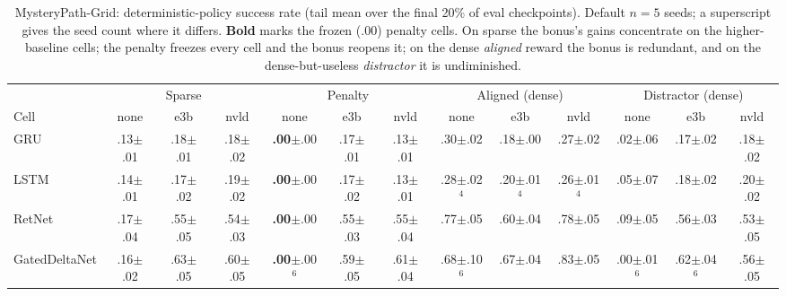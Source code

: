 \begin{table}[t]\centering
\caption{MysteryPath-Grid: deterministic-policy success rate (tail mean over the final 20\% of eval checkpoints). Default $n{=}5$ seeds; a superscript gives the seed count where it differs. \textbf{Bold} marks the frozen ($.00$) penalty cells. On sparse the bonus's gains concentrate on the higher-baseline cells; the penalty freezes every cell and the bonus reopens it; on the dense \emph{aligned} reward the bonus is redundant, and on the dense-but-useless \emph{distractor} it is undiminished.}
\label{tab:mpg}\small
\begin{tabular}{@{}l ccc ccc ccc ccc@{}}\toprule
 & \multicolumn{3}{c}{Sparse} & \multicolumn{3}{c}{Penalty} & \multicolumn{3}{c}{Aligned (dense)} & \multicolumn{3}{c}{Distractor (dense)} \\
\cmidrule(lr){2-4}\cmidrule(lr){5-7}\cmidrule(lr){8-10}\cmidrule(lr){11-13}
Cell & none & e3b & nvld & none & e3b & nvld & none & e3b & nvld & none & e3b & nvld \\\midrule
GRU & .13{\scriptsize$\pm$.01} & .18{\scriptsize$\pm$.01} & .18{\scriptsize$\pm$.02} & \textbf{.00}{\scriptsize$\pm$.00} & .17{\scriptsize$\pm$.01} & .13{\scriptsize$\pm$.01} & .30{\scriptsize$\pm$.02} & .18{\scriptsize$\pm$.00} & .27{\scriptsize$\pm$.02} & .02{\scriptsize$\pm$.06} & .17{\scriptsize$\pm$.02} & .18{\scriptsize$\pm$.02} \\
LSTM & .14{\scriptsize$\pm$.01} & .17{\scriptsize$\pm$.02} & .19{\scriptsize$\pm$.02} & \textbf{.00}{\scriptsize$\pm$.00} & .17{\scriptsize$\pm$.02} & .13{\scriptsize$\pm$.01} & .28{\scriptsize$\pm$.02}$^{4}$ & .20{\scriptsize$\pm$.01}$^{4}$ & .26{\scriptsize$\pm$.01}$^{4}$ & .05{\scriptsize$\pm$.07} & .18{\scriptsize$\pm$.02} & .20{\scriptsize$\pm$.02} \\
RetNet & .17{\scriptsize$\pm$.04} & .55{\scriptsize$\pm$.05} & .54{\scriptsize$\pm$.03} & \textbf{.00}{\scriptsize$\pm$.00} & .55{\scriptsize$\pm$.03} & .55{\scriptsize$\pm$.04} & .77{\scriptsize$\pm$.05} & .60{\scriptsize$\pm$.04} & .78{\scriptsize$\pm$.05} & .09{\scriptsize$\pm$.05} & .56{\scriptsize$\pm$.03} & .53{\scriptsize$\pm$.05} \\
GatedDeltaNet & .16{\scriptsize$\pm$.02} & .63{\scriptsize$\pm$.05} & .60{\scriptsize$\pm$.05} & \textbf{.00}{\scriptsize$\pm$.00}$^{6}$ & .59{\scriptsize$\pm$.05} & .61{\scriptsize$\pm$.04} & .68{\scriptsize$\pm$.10}$^{6}$ & .67{\scriptsize$\pm$.04} & .83{\scriptsize$\pm$.05} & .00{\scriptsize$\pm$.01}$^{6}$ & .62{\scriptsize$\pm$.04}$^{6}$ & .56{\scriptsize$\pm$.05} \\

\end{tabular}
\end{table}
